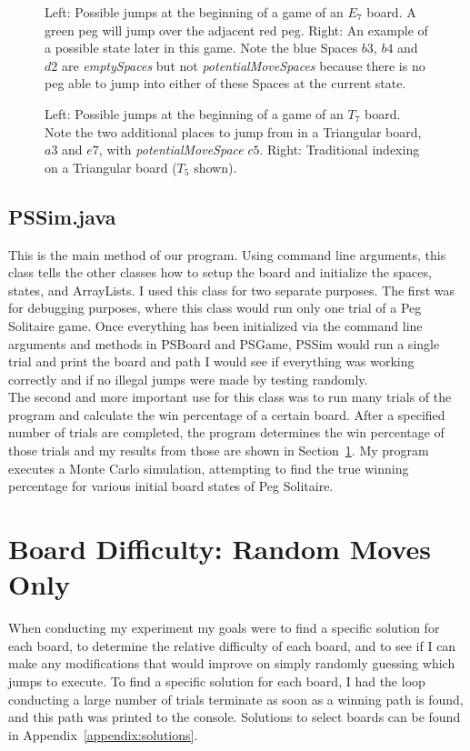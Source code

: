 \documentclass{article}
\newcommand\tab[1][.5cm]{\hspace*{#1}}
\begin{document}
\begin{figure}[htb]
\centering
{}
\caption{Left: Possible jumps at the beginning of a game of an $E_7$ board. A green peg will jump over the adjacent red peg. Right: An example of a possible state later in this game. Note the blue Spaces $b3$, $b4$ and $d2$ are \textit{emptySpaces} but not \textit{potentialMoveSpaces} because there is no peg able to jump into either of these Spaces at the current state.}
\label{fig4}
\end{figure}

\begin{figure}[htb]
\centering
{}
\caption{Left: Possible jumps at the beginning of a game of an $T_7$ board. Note the two additional places to jump from in a Triangular board, $a3$ and $e7$, with \textit{potentialMoveSpace} $c5$. Right: Traditional indexing on a Triangular board ($T_5$ shown).}
\label{fig5}
\end{figure}

\subsection{PSSim.java}
This is the main method of our program. Using command line arguments, this class tells the other classes how to setup the board and initialize the spaces, states, and ArrayLists. I used this class for two separate purposes. The first was for debugging purposes, where this class would run only one trial of a Peg Solitaire game. Once everything has been initialized via the command line arguments and methods in PSBoard and PSGame, PSSim would run a single trial and print the board and path I would see if everything was working correctly and if no illegal jumps were made by testing randomly.\\
\tab The second and more important use for this class was to run many trials of the program and calculate the win percentage of a certain board. After a specified number of trials are completed, the program determines the win percentage of those trials and my results from those are shown in Section~\ref{sec3}. My program executes a Monte Carlo simulation, attempting to find the true winning percentage for various initial board states of Peg Solitaire.

\section{Board Difficulty: Random Moves Only}
\label{sec3}
When conducting my experiment my goals were to find a specific solution for each board, to determine the relative difficulty of each board, and to see if I can make any modifications that would improve on simply randomly guessing which jumps to execute. To find a specific solution for each board, I had the loop conducting a large number of trials terminate as soon as a winning path is found, and this path was printed to the console. Solutions to select boards can be found in Appendix~\ref{appendix:solutions}.
\end{document}
